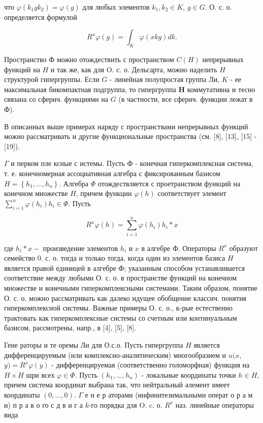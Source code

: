 \documentclass[10pt]{article}
\begin{document}
что $\varphi\left(k_{1} g k_{2}\right)=\varphi(g)$ для любых элементов $k_{1}, k_{2} \in K$, $g \in G$. О. с. о. определяется формулой



\[

R^{x} \varphi(g)=\int_{K} \varphi(x k g) d k .

\]



Пространство Ф можно отождествить с пространством $C(H)$ непрерывных функций на $H$ и так же, как для O. с. о. Дельсарта, можно наделить $H$ структурой гипергруппы. Если $G$ - линейная полупростая группа Ли, $K$ - ее максимальная бикомпактная подгруппа, то гипергруппа $\boldsymbol{H}$ коммутативна и тесно связана со сферич. функциями на $G$ (в частности, все сферич. функции лежат в Ф).



В описанных выше примерах наряду с пространствами непрерывных функций можно рассматривать и другие функциональные пространства (см. [8], [13], [15] - [19]).



$\Gamma$ и перком пле ксные с истемы. Пусть Ф - конечная гиперкомплексная система, т. е. конечномерная ассоциативная алгебра с фиксированным базисом $H=\left\{h_{1}, \ldots, h_{n}\right\}$. Алгебра $\Phi$ отождествляется с проетранством функций на конечном множестве $H$, причем функции $\varphi(h)$ соответствует элемент $\sum_{i=1}^{n} \varphi\left(h_{i}\right) h_{i} \in \Phi$. Пусть



\[

R^{x} \varphi(h)=\sum_{i=1}^{n} \varphi\left(h_{i}\right) h_{i} * x

\]



где $h_{i} * x-$ произведение элементов $h_{i}$ и $x$ в алгебре Ф. Операторы $R^{x}$ образуют семейство 0. с. о. тогда и только тогда, когда один из элементов базиса $H$ является правой единицей в алгебре Ф; указанным способом устанавливается соответствие между любыми О. с. о. в пространстве функций на конечном множестве и конечными гиперкомплексными системами. Таким образом, понятие О. с. о. можно рассматривать как далеко идущее обобщение классич. понятия гиперкомплексной системы. Важные примеры О. с. о., к-рые естественно трактовать как гиперкомплексные системы со счетным или континуальным базисом, рассмотрены, напр., в [4], [5], [8].



Гене раторы и те оремы Ли для О.с.о. Пусть гипергруппа $H$ является дифференцируемым (или комплексно-аналитическим) многообразием и $u(x$, $y)=R^{x} \varphi(y)$ - дифференцируемая (соответственно голоморфная) функция на $H \times H$ шри всех $\varphi \in \Phi$. Пусть $\left(h_{1}, \ldots, h_{n}\right)$ - локальные координаты точки $h \in H$, причем система координат выбрана так, что нейтральный әлемент имеет координаты $(0, \ldots, 0)$. $\Gamma$ е н е р аторами (инфинитезимальными операт о р а м и) п р а в о го с д в и г а $k$-го порядка для O. c. о. $R^{x}$ наз. линейные операторы вида
\end{document}
